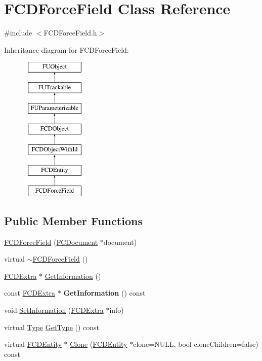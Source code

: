 \hypertarget{classFCDForceField}{
\section{FCDForceField Class Reference}
\label{classFCDForceField}
}


{\ttfamily \#include $<$FCDForceField.h$>$}

Inheritance diagram for FCDForceField:\begin{figure}[H]
\begin{center}
\leavevmode
\includegraphics[height=7.000000cm]{classFCDForceField}
\end{center}
\end{figure}
\subsection*{Public Member Functions}
\begin{DoxyCompactItemize}
\item 
\hyperlink{classFCDForceField_a1aef5213739e1091a7c8c4e5aa798498}{FCDForceField} (\hyperlink{classFCDocument}{FCDocument} $\ast$document)
\item 
virtual \hyperlink{classFCDForceField_a735c4afd89852cd4bb8298a71085f2f9}{$\sim$FCDForceField} ()
\item 
\hyperlink{classFCDExtra}{FCDExtra} $\ast$ \hyperlink{classFCDForceField_acf7035d6b5f08f88182afabf68eb2001}{GetInformation} ()
\item 
\hypertarget{classFCDForceField_aa70873280d33536212c026f9a226ce8f}{
const \hyperlink{classFCDExtra}{FCDExtra} $\ast$ {\bfseries GetInformation} () const }
\label{classFCDForceField_aa70873280d33536212c026f9a226ce8f}

\item 
void \hyperlink{classFCDForceField_a2ff4416e840c96f2725b067c233198bc}{SetInformation} (\hyperlink{classFCDExtra}{FCDExtra} $\ast$info)
\item 
virtual \hyperlink{classFCDEntity_a9301a4bd5f4d4190ec13e40db4effdd7}{Type} \hyperlink{classFCDForceField_a494b4e24b7bd9a5f11f9f46736704113}{GetType} () const 
\item 
virtual \hyperlink{classFCDEntity}{FCDEntity} $\ast$ \hyperlink{classFCDForceField_a1d5a404e537c12d32426b98dd6703290}{Clone} (\hyperlink{classFCDEntity}{FCDEntity} $\ast$clone=NULL, bool cloneChildren=false) const 
\end{DoxyCompactItemize}


